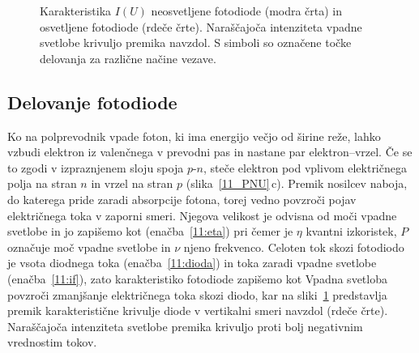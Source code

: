 \begin{figure}[h]
\centering
\def\svgwidth{100truemm} 

\caption{Karakteristika $I(U)$  neosvetljene fotodiode (modra črta)
in osvetljene fotodiode (rdeče črte). Naraščajoča intenziteta vpadne svetlobe
krivuljo premika navzdol. S simboli so označene točke delovanja za različne načine vezave.}
\label{11_IU}
\end{figure}
 
 
\subsection*{Delovanje fotodiode}
Ko na polprevodnik vpade foton, ki ima energijo večjo od širine reže, 
lahko vzbudi elektron iz valenčnega v prevodni pas in nastane par elektron--vrzel. 
Če se to zgodi v izpraznjenem sloju spoja $p$-$n$, steče elektron pod vplivom 
električnega polja na stran $n$ in vrzel na stran $p$ (slika~\ref{11_PNU}\,c). 
Premik nosilcev naboja, do katerega pride zaradi absorpcije fotona, torej vedno
povzroči pojav električnega toka v zaporni smeri. 
Njegova velikost je odvisna od moči vpadne svetlobe in jo zapišemo kot 
(enačba~\ref{11:eta})
pri čemer je $\eta$ kvantni izkoristek, $P$ označuje moč vpadne svetlobe in $\nu$ njeno
frekvenco. Celoten tok skozi fotodiodo je vsota diodnega toka (enačba~\ref{11:dioda}) 
in toka zaradi vpadne svetlobe (enačba~\ref{11:if}), zato karakteristiko fotodiode zapišemo kot 
Vpadna svetloba povzroči zmanjšanje električnega toka skozi diodo, 
kar na sliki~\ref{11_IU} predstavlja premik karakteristične krivulje diode v vertikalni 
smeri navzdol (rdeče črte). Naraščajoča intenziteta svetlobe premika krivuljo proti 
bolj negativnim vrednostim tokov. 

